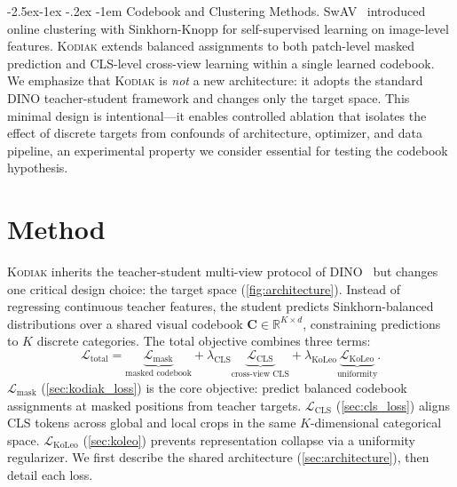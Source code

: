 \documentclass[runningheads]{llncs}
\makeatletter
\newcommand{\method}{\textsc{Kodiak}}
\renewcommand\paragraph{\@startsection{paragraph}{4}{\z@}%
  {-2.5ex\@plus -1ex \@minus -.2ex}%
  {-1em}%
  {\normalfont\normalsize\bfseries}}
\makeatother
\begin{document}
\paragraph{Codebook and Clustering Methods.}
SwAV~\cite{caron2020unsupervised} introduced online clustering with Sinkhorn-Knopp for self-supervised learning on image-level features.
\method{} extends balanced assignments to both patch-level masked prediction and CLS-level cross-view learning within a single learned codebook.
We emphasize that \method{} is \emph{not} a new architecture: it adopts the standard DINO teacher-student framework and changes only the target space.
This minimal design is intentional---it enables controlled ablation that isolates the effect of discrete targets from confounds of architecture, optimizer, and data pipeline, an experimental property we consider essential for testing the codebook hypothesis.


\section{Method}
\label{sec:method}

\method{} inherits the teacher-student multi-view protocol of DINO~\cite{caron2021emerging} but changes one critical design choice: the target space (\cref{fig:architecture}).
Instead of regressing continuous teacher features, the student predicts Sinkhorn-balanced distributions over a shared visual codebook $\mathbf{C} \in \mathbb{R}^{K \times d}$, constraining predictions to $K$ discrete categories.
The total objective combines three terms:
\begin{equation}
    \mathcal{L}_{\text{total}} = \underbrace{\mathcal{L}_{\text{mask}}}_{\text{masked codebook}} + \lambda_{\text{CLS}} \underbrace{\mathcal{L}_{\text{CLS}}}_{\text{cross-view CLS}} + \lambda_{\text{KoLeo}} \underbrace{\mathcal{L}_{\text{KoLeo}}}_{\text{uniformity}}.
    \label{eq:total_loss}
\end{equation}
$\mathcal{L}_{\text{mask}}$ (\cref{sec:kodiak_loss}) is the core objective: predict balanced codebook assignments at masked positions from teacher targets.
$\mathcal{L}_{\text{CLS}}$ (\cref{sec:cls_loss}) aligns CLS tokens across global and local crops in the same $K$-dimensional categorical space.
$\mathcal{L}_{\text{KoLeo}}$ (\cref{sec:koleo}) prevents representation collapse via a uniformity regularizer.
We first describe the shared architecture (\cref{sec:architecture}), then detail each loss.
\end{document}
